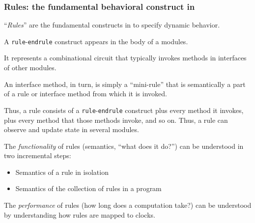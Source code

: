 
\begin{frame}[fragile]
\frametitle{Rules: the fundamental behavioral construct in {\BSV}}

\footnotesize

{\large ``\emph{Rules}'' are the fundamental constructs in {\BSV}
 to specify dynamic behavior.}

\vspace{4ex}

A {\tt rule}-{\tt endrule} construct appears in the body of a {\BSV} modules.

\vspace{1ex}

It represents a combinational circuit that typically invokes methods
in interfaces of other modules.

\vspace{1ex}

An interface method, in turn, is simply a ``mini-rule'' that is
semantically a part of a rule or interface method from which it is
invoked.

\vspace{1ex}

Thus, a rule consists of a {\tt rule}-{\tt endrule} construct plus
every method it invokes, plus every method that those methods invoke,
and so on.  Thus, a rule can observe and update state in several modules.

\PAUSE{\vspace{4ex}}

The \emph{functionality} of rules (semantics, ``what does it do?'')
can be understood in two incremental steps:

\begin{itemize}

 \item Semantics of a rule in isolation

 \item Semantics of the collection of rules in a {\BSV} program

\end{itemize}

\PAUSE{\vspace{4ex}}

The \emph{performance} of rules (how long does a computation take?)
can be understood by understanding how rules are mapped to clocks.

\end{frame}

